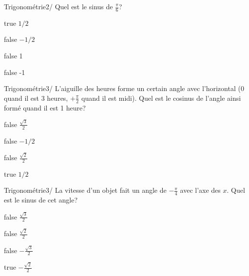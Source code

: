             \begin{question}{31}{Trigonométrie}{2}{/}
            	Quel est le sinus de $\frac{\pi}{6}$? 
            \end{question}
            \begin{reponses}
                \item[true] $1/2$
                \item[false] $-1/2$
                \item[false] 1
                \item[false] -1
            \end{reponses}
        	\begin{question}{31}{Trigonométrie}{3}{/}
				L'aiguille des heures forme un certain angle avec l'horizontal (0 quand il est 3 heures, $+\frac{\pi}{2}$ quand il est midi). Quel est le cosinus de l'angle ainsi formé quand il est 1 heure? 
            \end{question}
            \begin{reponses}
            	\item[false] $\frac{\sqrt{3}}{2}$
            	\item[false] $-1/2$
                \item[false] $\frac{\sqrt{2}}{2}$
                \item[true] $1/2$
            \end{reponses}
        	\begin{question}{31}{Trigonométrie}{3}{/}
				La vitesse d'un objet fait un angle de $-\frac{\pi}{4}$ avec l'axe des $x$. Quel est le sinus de cet angle?
            \end{question}
            \begin{reponses}
            	\item[false] $\frac{\sqrt{3}}{2}$
            	\item[false] $\frac{\sqrt{2}}{2}$
                \item[false] $-\frac{\sqrt{3}}{2}$
                \item[true] $-\frac{\sqrt{2}}{2}$
            \end{reponses}
